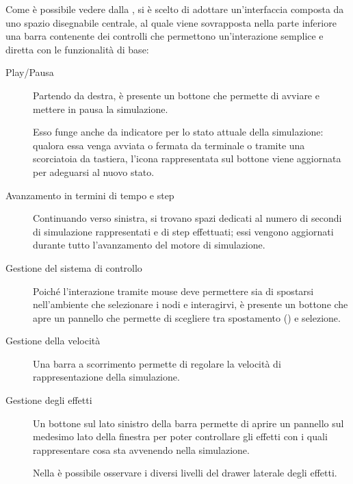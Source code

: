         Come è possibile vedere dalla , si è scelto di adottare un'interfaccia composta da uno spazio disegnabile centrale, al quale viene sovrapposta nella parte inferiore una barra contenente dei controlli che permettono un'interazione semplice e diretta con le funzionalità di base:

        \begin{description}
            \item [Play/Pausa]
                Partendo da destra, è presente un bottone che permette di avviare e mettere in pausa la simulazione.

                Esso funge anche da indicatore per lo stato attuale della simulazione:
                qualora essa venga avviata o fermata da terminale o tramite una scorciatoia da tastiera, l'icona rappresentata sul bottone viene aggiornata per adeguarsi al nuovo stato.

            \item[Avanzamento in termini di tempo e step]
                Continuando verso sinistra, si trovano spazi dedicati al numero di secondi di simulazione rappresentati e di step effettuati;
                essi vengono aggiornati durante tutto l'avanzamento del motore di simulazione.

            \item[Gestione del sistema di controllo]
                Poiché l'interazione tramite mouse deve permettere sia di spostarsi nell'ambiente che selezionare i nodi e interagirvi, è presente un bottone che apre un pannello che permette di scegliere tra spostamento () e selezione.

            \item[Gestione della velocità]
                Una barra a scorrimento permette di regolare la velocità di rappresentazione della simulazione.

            \item[Gestione degli effetti]
                Un bottone sul lato sinistro della barra permette di aprire un pannello sul medesimo lato della finestra per poter controllare gli effetti con i quali rappresentare cosa sta avvenendo nella simulazione.

                Nella  è possibile osservare i diversi livelli del drawer laterale degli effetti.


\end{description}
